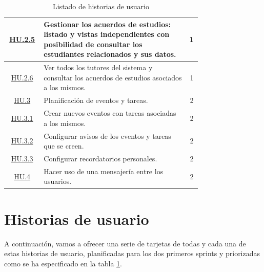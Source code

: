 \begin{table}[h]
\begin{center}
\begin{adjustbox}{width=1\textwidth}
\begin{tabular}{ | c | >{\centering\arraybackslash}p{0.75\linewidth} | c | }
				\hline
					\hyperref[tab:HU2.5]{HU.2.5} & Gestionar los acuerdos de estudios: listado y vistas independientes con posibilidad de consultar los estudiantes relacionados y sus datos. & 1 \\
				\hline
					\hyperref[tab:HU2.6]{HU.2.6} & Ver todos los tutores del sistema y consultar los acuerdos de estudios asociados a los mismos. & 1 \\
				\hline
					\hyperref[tab:HU3]{HU.3} & Planificación de eventos y tareas. & 2 \\
				\hline
					\hyperref[tab:HU3.1]{HU.3.1} & Crear nuevos eventos con tareas asociadas a los mismos. & 2 \\
				\hline
					\hyperref[tab:HU3.2]{HU.3.2} & Configurar avisos de los eventos y tareas que se creen. & 2 \\
				\hline
					\hyperref[tab:HU3.3]{HU.3.3} & Configurar recordatorios personales. & 2 \\
				\hline
					\hyperref[tab:HU4]{HU.4} & Hacer uso de una mensajería entre los usuarios. & 2 \\
				\hline			
			\end{tabular}	
		\end{adjustbox}
		\caption{Listado de historias de usuario}
		\label{tab:listadoHU}
	\end{center}
\end{table}

\section{Historias de usuario}

A continuación, vamos a ofrecer una serie de tarjetas de todas y cada una de estas historias de usuario, planificadas para los dos primeros sprints y priorizadas como se ha especificado en la tabla \ref{tab:listadoHU}.

